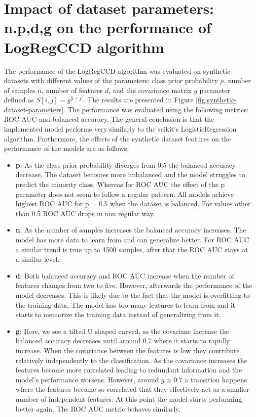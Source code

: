 \documentclass[12pt]{article}
\begin{document}
\section{Impact of dataset parameters: n.p,d,g on the performance of LogRegCCD algorithm}

The performance of the LogRegCCD algorithm was evaluated on synthetic datasets with different values of the parameters: class prior probability $p$, number of samples $n$, number of features $d$, and the covariance matrix $g$ parameter defined as $S[i,j] = g^{|i-j|}$. The results are presented in Figure \ref{fig:synthetic-dataset-parameters}. The performance was evaluated using the following metrics: ROC AUC and balanced accuracy. The general conclusion is that the implemented model performs very similarly to the scikit's LogisticRegression algorithm. Furthermore, the effects of the synthetic dataset features on the performance of the models are as follows:

\begin{itemize}
    \item \textbf{p}: As the class prior probability diverges from 0.5 the balanced accuracy decrease. The dataset becomes more imbalanced and the model struggles to predict the minority class. Whereas for ROC AUC the effect of the p parameter does not seem to follow a regular pattern. All models achieve highest ROC AUC for p = 0.5 when the dataset is balanced. For values other than 0.5 ROC AUC drops in non regular way.
    \item \textbf{n}: As the number of samples increases the balanced accuracy increases. The model has more data to learn from and can generalize better. For ROC AUC a similar trend is true up to 1500 samples, after that the ROC AUC stays at a similar level.
    \item \textbf{d}: Both balanced accuracy and ROC AUC increase when the number of features changes from two to five. However, afterwards the performance of the model decreases. This is likely due to the fact that the model is overfitting to the training data. The model has too many features to learn from and it starts to memorize the training data instead of generalizing from it.
    \item \textbf{g}: Here, we see a tilted U shaped curved, as the covarianc increase the balanced accuracy decreases until around 0.7 where it starts to rapidly increase. When the covariance between the features is low they contribute relatively independently to the classification. As the covariance increases the features become more correlated leading to redundant information and the model's performance worsens. However, around $g \approx 0.7$ a transition happens where the features become so correlated that they effectively act as a smaller number of independent features. At this point the model starts performing better again. The ROC AUC metric behaves similarly.
    
\end{itemize}
\end{document}
